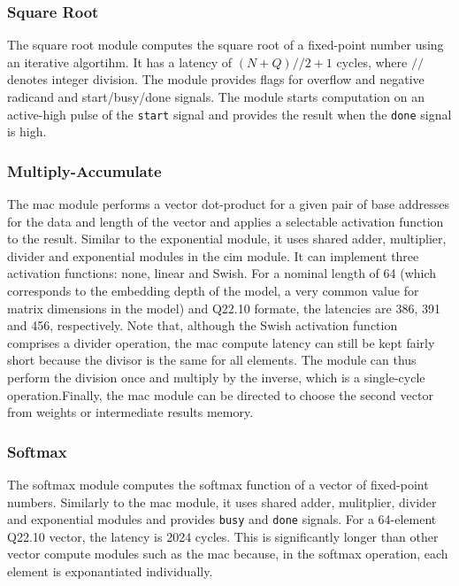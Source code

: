 \documentclass[12pt, hidelinks]{article}
\begin{document}
\subsubsection{Square Root}
The square root module computes the square root of a fixed-point number using an iterative algortihm. It has a latency of $(N+Q)//2+1$ cycles, where $//$ denotes integer division. The module provides flags for overflow and 
negative radicand and start/busy/done signals. The module starts computation on an active-high pulse of the \texttt{start} signal and provides the result when the \texttt{done} signal is high.

\subsubsection{Multiply-Accumulate}
The \ac{mac} module performs a vector dot-product for a given pair of base addresses for the data and length of the vector and applies a selectable activation function to the result. Similar to the exponential module, it
uses shared adder, multiplier, divider and exponential modules in the \ac{cim} module. It can implement three activation functions: none, linear and Swish. For a nominal length of 64 (which corresponds to the embedding
depth of the model, a very common value for matrix dimensions in the model) and Q22.10 formate, the latencies are 386, 391 and 456, respectively. Note that, although the Swish activation function comprises a divider operation,
the \ac{mac} compute latency can still be kept fairly short because the divisor is the same for all elements. The module can thus perform the division once and multiply by the inverse, which is a single-cycle operation.Finally,
the \ac{mac} module can be directed to choose the second vector from weights or intermediate results memory.

\subsubsection{Softmax}
The softmax module computes the softmax function of a vector of fixed-point numbers. Similarly to the \ac{mac} module, it uses shared adder, mulitplier, divider and exponential modules and provides \texttt{busy} and
\texttt{done} signals. For a 64-element Q22.10 vector, the latency is 2024 cycles. This is significantly longer than other vector compute modules such as the \ac{mac} because, in the softmax operation, each element is exponantiated
individually.
\end{document}

